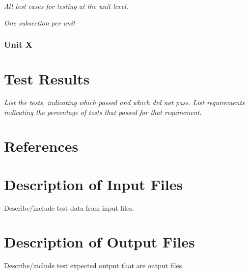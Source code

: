 \documentclass[12pt]{article}
\newcounter{req ID}
\begin{document}
{\it
All test cases for testing at the unit level.
}

{\it
One subsection per unit
}

\subsubsection{Unit X}

\section{Test Results}

{\it
List the tests, indicating which passed and which did not pass.
List requirements indicating the percentage of tests that passed for that requirement.
}

\section{References}

\appendix

\section{Description of Input Files}

Describe/include test data from input files.

\section{Description of Output Files}

Describe/include test expected output that are output files.
\end{document}
